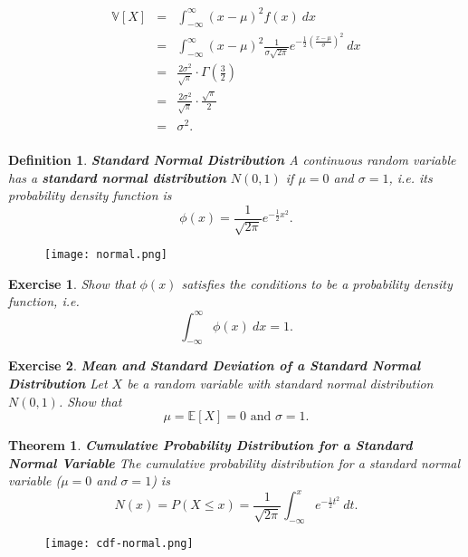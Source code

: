 \documentclass[letterpaper,10pt]{article}
\newtheorem{thm}{Theorem}
\newtheorem{df}{Definition}[section]
\newtheorem{ex}{Exercise}
\begin{document}
\begin{eqnarray*}
\mathbb{V}[X]&=&\int_{-\infty}^{\infty}(x-\mu)^2 f(x)\:dx\\
&=&\int_{-\infty}^{\infty} (x-\mu)^2\frac{1}{\sigma\sqrt{2\pi}}e^{-\frac{1}{2}\left(\frac{x-\mu}{\sigma}\right)^2}\:dx\\
&=&\frac{2 \sigma^2}{\sqrt{\pi}} \cdot \Gamma\left(\frac{3}{2}\right)\\
& =& \frac{2 \sigma^2}{\sqrt{\pi}} \cdot \frac{\sqrt{\pi}}{2} \\
&=& \sigma^2.\\
\end{eqnarray*}

\begin{df}{\bf Standard Normal Distribution}
A continuous random variable has a {\bf standard normal distribution} $N(0,1)$ if $\mu=0$ and $\sigma=1$, i.e. its probability density function is $$\phi(x)=\frac{1}{\sqrt{2\pi}}e^{-\frac{1}{2}x^2}.$$
\end{df}

\begin{center}
\begin{figure}[H]
\texttt{[image: normal.png]}
\end{figure}
\end{center}

\begin{ex} Show that $\phi(x)$ satisfies the conditions to be a probability density function, i.e. $$\int_{-\infty}^{\infty}\phi(x)\:dx=1.$$
\end{ex}

\begin{ex}{\bf Mean and Standard Deviation of a Standard Normal Distribution}
Let $X$ be a random variable with standard normal distribution $N(0,1)$.  Show that $$\mu=\mathbb{E}[X]=0\text{ and }\sigma=1.$$
\end{ex}


\begin{thm}{\bf Cumulative Probability Distribution for a Standard Normal Variable}
The cumulative probability distribution for a standard normal variable ($\mu=0$ and $\sigma=1$) is $$N(x)=P(X\leq x)=\frac{1}{\sqrt{2\pi}}\int_{-\infty}^xe^{-\frac{1}{2}t^2}\:dt.$$
\end{thm}

\begin{center}
\begin{figure}[H]
\texttt{[image: cdf-normal.png]}
\end{figure}
\end{center}
\end{document}
